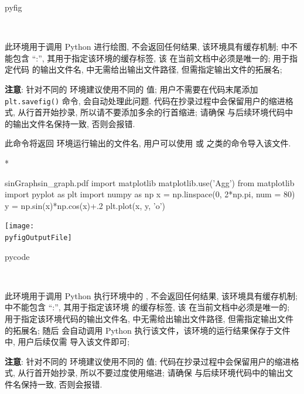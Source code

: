 \documentclass[
  hyper, lang=cn, 
  class=l3dox, 
]{../../zlatex/code/ztex}
\begin{document}
\begin{function}[updated=2025-05-29]{pyfig}
  \begin{syntax}
    ~~~~ 
  \end{syntax}
  此环境用于调用 Python 进行绘图, 不会返回任何结果, 该环境具有缓存机制;  中不能包含 ``:'', 其用于指定该环境的缓存标签, 
  该  在当前文档中必须是唯一的;  用于指定代码  的输出文件名, 
   中无需给出输出文件路径, 但需指定输出文件的拓展名;\par 
  \textbf{注意}: 针对不同的  环境建议使用不同的  值; 用户不需要在代码末尾添加 \verb|plt.savefig()| 命令,
  \ztikz{} 会自动处理此问题. 代码在抄录过程中会保留用户的缩进格式, 从行首开始抄录, 所以请不要添加多余的行首缩进;
  请确保  与后续环境代码中的输出文件名保持一致, 否则会报错.
\end{function}


\begin{function}[added=2025-04-21, EXP]{\pyfigOutputFile}
  此命令将返回  环境运行输出的文件名, 用户可以使用  
  或  之类的命令导入该文件.
\end{function}

\begin{DocExample}*
\begin{pyfig}{sinGraph}{sin_graph.pdf}
import matplotlib
matplotlib.use('Agg')
from matplotlib import pyplot as plt
import numpy as np
x = np.linspace(0, 2*np.pi, num = 80)
y = np.sin(x)*np.cos(x)+.2
plt.plot(x, y, 'o')
\end{pyfig}
\begin{center}
  \texttt{[image: \\pyfigOutputFile]}
\end{center}
\end{DocExample}


\begin{function}[added=2025-05-21]{pycode}
  \begin{syntax}
  ~~~~ 
  \end{syntax}
  此环境用于调用 Python 执行环境中的 , 不会返回任何结果, 该环境具有缓存机制;  中不能包含 ``:'', 其用于指定该环境
  的缓存标签, 该  在当前文档中必须是唯一的;  用于指定该环境代码的输出文件名,  中无需给出输出文件路径, 但需指定输出文件的拓展名; 
  随后 \ztikz{} 会自动调用 Python 执行该文件，该环境的运行结果保存于文件  中, 用户后续仅需
  导入该文件即可;\par 
  \textbf{注意}: 针对不同的  环境建议使用不同的  值; 代码在抄录过程中会保留用户的缩进格式, 
  从行首开始抄录, 所以不要过度使用缩进; 请确保  与后续环境代码中的输出文件名保持一致, 否则会报错.
\end{function}
\end{document}
